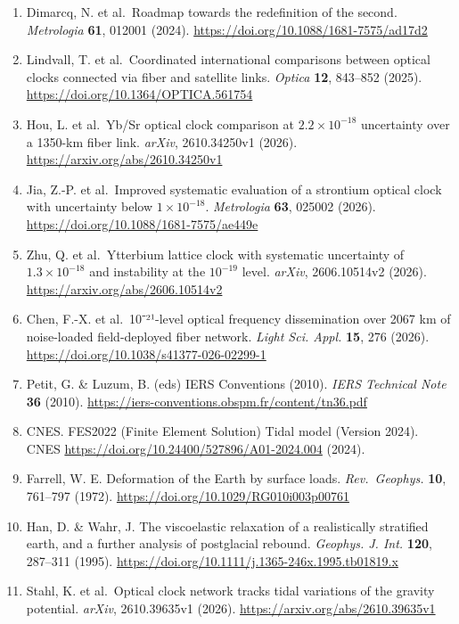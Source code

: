 \documentclass[
  12pt,
  a4paper,
]{article}
\begin{document}
\begin{enumerate}
  Schröder, S., Stellmer, S. \& Kusche, J. Potential and scientific
  requirements of optical clock networks for validating
  satellite-derived time-variable gravity data. \emph{Geophys. J. Int.}
  \textbf{226}, 764--779 (2021).
  \url{https://academic.oup.com/gji/article/226/2/764/6212226}
\item
  Dimarcq, N. et al.~Roadmap towards the redefinition of the second.
  \emph{Metrologia} \textbf{61}, 012001 (2024).
  \url{https://doi.org/10.1088/1681-7575/ad17d2}
\item
  Lindvall, T. et al.~Coordinated international comparisons between
  optical clocks connected via fiber and satellite links. \emph{Optica}
  \textbf{12}, 843--852 (2025).
  \url{https://doi.org/10.1364/OPTICA.561754}
\item
  Hou, L. et al.~Yb/Sr optical clock comparison at \(2.2\times10^{-18}\)
  uncertainty over a 1350-km fiber link. \emph{arXiv}, 2610.34250v1
  (2026). \url{https://arxiv.org/abs/2610.34250v1}
\item
  Jia, Z.-P. et al.~Improved systematic evaluation of a strontium
  optical clock with uncertainty below \(1\times10^{-18}\).
  \emph{Metrologia} \textbf{63}, 025002 (2026).
  \url{https://doi.org/10.1088/1681-7575/ae449e}
\item
  Zhu, Q. et al.~Ytterbium lattice clock with systematic uncertainty of
  \(1.3\times 10^{-18}\) and instability at the \(10^{-19}\) level.
  \emph{arXiv}, 2606.10514v2 (2026).
  \url{https://arxiv.org/abs/2606.10514v2}
\item
  Chen, F.-X. et al.~10⁻²¹-level optical frequency dissemination over
  2067 km of noise-loaded field-deployed fiber network. \emph{Light Sci.
  Appl.} \textbf{15}, 276 (2026).
  \url{https://doi.org/10.1038/s41377-026-02299-1}
\item
  Petit, G. \& Luzum, B. (eds) IERS Conventions (2010). \emph{IERS
  Technical Note} \textbf{36} (2010).
  \url{https://iers-conventions.obspm.fr/content/tn36.pdf}
\item
  CNES. FES2022 (Finite Element Solution) Tidal model (Version 2024).
  CNES \url{https://doi.org/10.24400/527896/A01-2024.004} (2024).
\item
  Farrell, W. E. Deformation of the Earth by surface loads.
  \emph{Rev.~Geophys.} \textbf{10}, 761--797 (1972).
  \url{https://doi.org/10.1029/RG010i003p00761}
\item
  Han, D. \& Wahr, J. The viscoelastic relaxation of a realistically
  stratified earth, and a further analysis of postglacial rebound.
  \emph{Geophys. J. Int.} \textbf{120}, 287--311 (1995).
  \url{https://doi.org/10.1111/j.1365-246x.1995.tb01819.x}
\item
  Stahl, K. et al.~Optical clock network tracks tidal variations of the
  gravity potential. \emph{arXiv}, 2610.39635v1 (2026).
  \url{https://arxiv.org/abs/2610.39635v1}
\end{enumerate}
\end{document}
